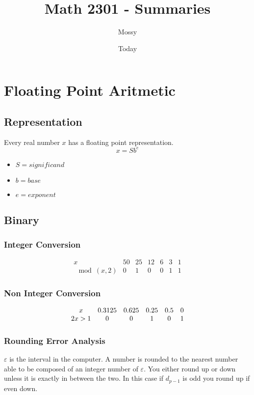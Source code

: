 \documentclass[]{article}
\begin{document}
\title{Math 2301 - Summaries}
\author{Mossy}
\date{Today}
\maketitle

\section*{Floating Point Aritmetic}
\subsection*{Representation}
Every real number $x$ has a floating point representation.
\[x = S b^e\]
\begin{itemize}
\item $S = significand$
\item $b = base$
\item $e = exponent$
\end{itemize}


\subsection*{Binary}
\subsubsection*{Integer Conversion}
\[
\begin{array}{ccccccc}
x & 50 & 25 & 12 & 6 & 3 & 1\\
\mod(x,2) & 0 & 1 & 0 & 0 & 1 & 1
\end{array}
\]

\subsubsection*{Non Integer Conversion}
\[
\begin{array}{c c c c c c}
x & 0.3125 & 0.625 & 0.25 & 0.5 & 0\\
2x > 1 & 0 & 0 & 1 & 0 & 1
\end{array}
\]
\pagebreak

\subsubsection*{Rounding Error Analysis}
$\varepsilon$ is the interval in the computer. A number is rounded to the nearest number able to be composed of an integer number of $\varepsilon$. You either round up or down unless it is exactly in between the two. In this case if $d_{p-1}$ is odd you round up if even down.
\end{document}

